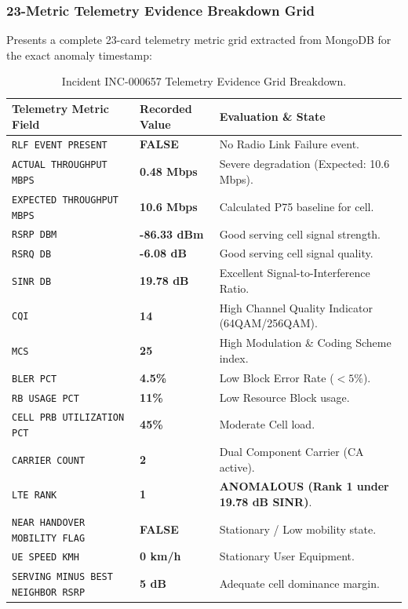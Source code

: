 \documentclass[12pt,a4paper]{report}
\begin{document}
\subsubsection{23-Metric Telemetry Evidence Breakdown Grid}
Presents a complete 23-card telemetry metric grid extracted from MongoDB for the exact anomaly timestamp:
\begin{table}[htbp]
\centering
\caption{Incident INC-000657 Telemetry Evidence Grid Breakdown.}
\label{tab:inc_657_grid}
\small
\begin{tabular}{lll}
\toprule
\textbf{Telemetry Metric Field} & \textbf{Recorded Value} & \textbf{Evaluation \& State} \\
\midrule
\texttt{RLF EVENT PRESENT} & \textbf{FALSE} & No Radio Link Failure event. \\
\texttt{ACTUAL THROUGHPUT MBPS} & \textbf{0.48 Mbps} & Severe degradation (Expected: 10.6 Mbps). \\
\texttt{EXPECTED THROUGHPUT MBPS} & \textbf{10.6 Mbps} & Calculated P75 baseline for cell. \\
\texttt{RSRP DBM} & \textbf{-86.33 dBm} & Good serving cell signal strength. \\
\texttt{RSRQ DB} & \textbf{-6.08 dB} & Good serving cell signal quality. \\
\texttt{SINR DB} & \textbf{19.78 dB} & Excellent Signal-to-Interference Ratio. \\
\texttt{CQI} & \textbf{14} & High Channel Quality Indicator (64QAM/256QAM). \\
\texttt{MCS} & \textbf{25} & High Modulation \& Coding Scheme index. \\
\texttt{BLER PCT} & \textbf{4.5\%} & Low Block Error Rate ($<5\%$). \\
\texttt{RB USAGE PCT} & \textbf{11\%} & Low Resource Block usage. \\
\texttt{CELL PRB UTILIZATION PCT} & \textbf{45\%} & Moderate Cell load. \\
\texttt{CARRIER COUNT} & \textbf{2} & Dual Component Carrier (CA active). \\
\texttt{LTE RANK} & \textbf{1} & \textbf{ANOMALOUS (Rank 1 under 19.78 dB SINR)}. \\
\texttt{NEAR HANDOVER MOBILITY FLAG} & \textbf{FALSE} & Stationary / Low mobility state. \\
\texttt{UE SPEED KMH} & \textbf{0 km/h} & Stationary User Equipment. \\
\texttt{SERVING MINUS BEST NEIGHBOR RSRP} & \textbf{5 dB} & Adequate cell dominance margin. \\

\end{tabular}
\end{table}
\end{document}
